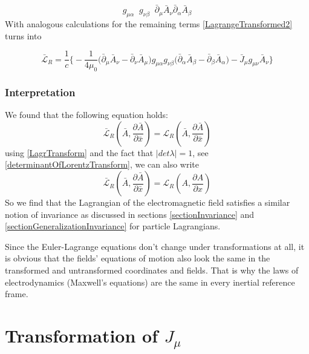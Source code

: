 \documentclass{article}
\begin{document}
\begin{equation}
    g_{\mu\alpha} \;\; g_{\nu\beta} \;\; \bar{\partial}_\mu \bar{A}_\nu \bar{\partial}_\alpha \bar{A}_\beta
\end{equation}
With analogous calculations for the remaining terms \ref{LagrangeTransformed2} turns into

\begin{equation} \label{LagrangeTransformFinal}
    \bar{\mathcal{L}}_R = \frac{1}{c} \bigg\{ -\frac{1}{4\mu_0}
    \big(\bar{\partial}_\mu \bar{A}_\nu - \bar{\partial}_\nu \bar{A}_\mu \big)
    g_{\mu\alpha} g_{\nu\beta}
    \big(\bar{\partial}_\alpha \bar{A}_\beta - \bar{\partial}_\beta \bar{A}_\alpha\big)
    - \bar{J}_\mu g_{\mu\nu} \bar{A}_\nu \bigg\}
\end{equation}

\subsubsection{Interpretation} \label{invarianceMaxwell}

We found that the following equation holds:
\begin{equation}
    \bar{\mathcal{L}}_R(\bar{A}, \frac{\partial \bar{A}}{\partial \bar{x}}) = \mathcal{L}_R(\bar{A}, \frac{\partial \bar{A}}{\partial \bar{x}})
\end{equation}
using \ref{LagrTransform} and the fact that $|det\lambda| = 1$, see \ref{determinantOfLorentzTransform}, we can also write
\begin{equation}
    \bar{\mathcal{L}}_R(\bar{A}, \frac{\partial \bar{A}}{\partial \bar{x}}) = \mathcal{L}_R(A, \frac{\partial A}{\partial x})
\end{equation}
So we find that the Lagrangian of the electromagnetic field satisfies a similar notion of invariance as discussed in sections \ref{sectionInvariance} and \ref{sectionGeneralizationInvariance}
for particle Lagrangians.

Since the Euler-Lagrange equations don't change under transformations at all, it is obvious that the fields' equations of motion also look the same
in the transformed and untransformed coordinates and fields.
That is why the laws of electrodynamics (Maxwell's equations) are the same in every inertial reference frame.



\appendix

\section{Transformation of $J_\mu$} \label{appendixConinuity}
\end{document}
